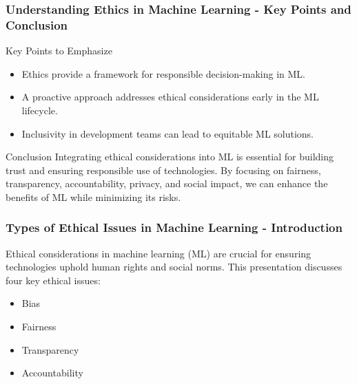\documentclass[aspectratio=169]{beamer}
\begin{document}
\begin{frame}[fragile]
    \frametitle{Understanding Ethics in Machine Learning - Key Points and Conclusion}
    \begin{block}{Key Points to Emphasize}
        \begin{itemize}
            \item Ethics provide a framework for responsible decision-making in ML.
            \item A proactive approach addresses ethical considerations early in the ML lifecycle.
            \item Inclusivity in development teams can lead to equitable ML solutions.
        \end{itemize}
    \end{block}

    \begin{block}{Conclusion}
        Integrating ethical considerations into ML is essential for building trust and ensuring responsible use of technologies. By focusing on fairness, transparency, accountability, privacy, and social impact, we can enhance the benefits of ML while minimizing its risks.
    \end{block}
\end{frame}

\begin{frame}[fragile]
    \frametitle{Types of Ethical Issues in Machine Learning - Introduction}
    Ethical considerations in machine learning (ML) are crucial for ensuring technologies uphold human rights and social norms. This presentation discusses four key ethical issues:
    \begin{itemize}
        \item Bias
        \item Fairness
        \item Transparency
        \item Accountability
    \end{itemize}
\end{frame}
\end{document}
